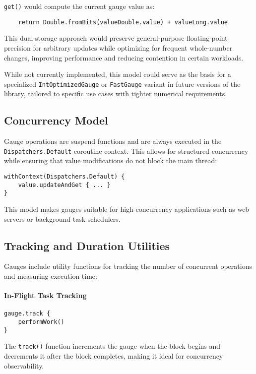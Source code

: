     \texttt{get()} would compute the current gauge value as:
    \begin{verbatim}
    return Double.fromBits(valueDouble.value) + valueLong.value
    \end{verbatim}

This dual-storage approach would preserve general-purpose floating-point precision for arbitrary updates while optimizing for frequent whole-number changes, improving performance and reducing contention in certain workloads.

While not currently implemented, this model could serve as the basis for a specialized \texttt{IntOptimizedGauge} or \texttt{FastGauge} variant in future versions of the library, tailored to specific use cases with tighter numerical requirements.




\subsection{Concurrency Model}
Gauge operations are suspend functions and are always executed in the \texttt{Dispatchers.Default} coroutine context. This allows for structured concurrency while ensuring that value modifications do not block the main thread:

\begin{verbatim}
withContext(Dispatchers.Default) {
    value.updateAndGet { ... }
}
\end{verbatim}

This model makes gauges suitable for high-concurrency applications such as web servers or background task schedulers.

\subsection{Tracking and Duration Utilities}
Gauges include utility functions for tracking the number of concurrent operations and measuring execution time:

\paragraph{In-Flight Task Tracking}

\begin{verbatim}
gauge.track {
    performWork()
}
\end{verbatim}

The \texttt{track()} function increments the gauge when the block begins and decrements it after the block completes, making it ideal for concurrency observability.

